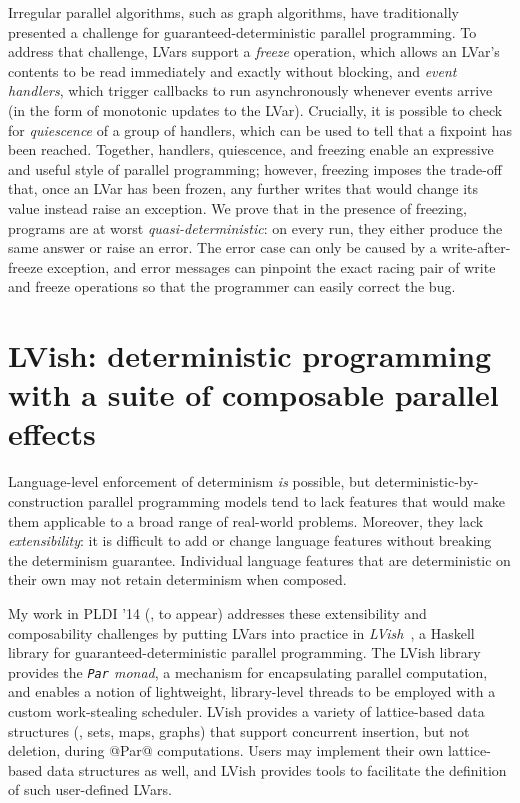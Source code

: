 \documentclass{article}
\begin{document}
Irregular parallel algorithms, such as graph algorithms, have
traditionally presented a challenge for guaranteed-deterministic
parallel programming.  To address that challenge, LVars support a
\emph{freeze} operation, which allows an LVar's contents to be read
immediately and exactly without blocking, and \emph{event handlers},
which trigger callbacks to run asynchronously whenever events arrive
(in the form of monotonic updates to the LVar).  Crucially, it is
possible to check for \emph{quiescence} of a group of handlers, which
can be used to tell that a fixpoint has been reached.  Together,
handlers, quiescence, and freezing enable an expressive and useful
style of parallel programming; however, freezing imposes the trade-off
that, once an LVar has been frozen, any further writes that would
change its value instead raise an exception.  We prove that in the
presence of freezing, programs are at worst
\emph{quasi-deterministic}: on every run, they either produce the same
answer or raise an error.  The error case can only be caused by a
write-after-freeze exception, and error messages can pinpoint the
exact racing pair of write and freeze operations so that the
programmer can easily correct the bug.

\section{LVish: deterministic programming with a suite of composable parallel effects}\label{effectzoo}

Language-level enforcement of determinism \emph{is} possible, but
deterministic-by-construction parallel programming models tend to lack
features that would make them applicable to a broad range of
real-world problems. Moreover, they lack \emph{extensibility}: it is
difficult to add or change language features without breaking the
determinism guarantee.  Individual language features that are
deterministic on their own may not retain determinism when composed.

My work in PLDI '14 (\cite{effectzoo}, to appear) addresses these
extensibility and composability challenges by putting LVars into
practice in \emph{LVish}~\cite{LVish}, a Haskell library for
guaranteed-deterministic parallel programming.  The LVish library
provides the \emph{\lstinline|Par| monad}, a mechanism for
encapsulating parallel computation, and enables a notion of
lightweight, library-level threads to be employed with a custom
work-stealing scheduler.  LVish provides a variety of lattice-based
data structures (\eg, sets, maps, graphs) that support concurrent
insertion, but not deletion, during @Par@ computations.  Users may
implement their own lattice-based data structures as well, and LVish
provides tools to facilitate the definition of such user-defined
LVars.
\end{document}
